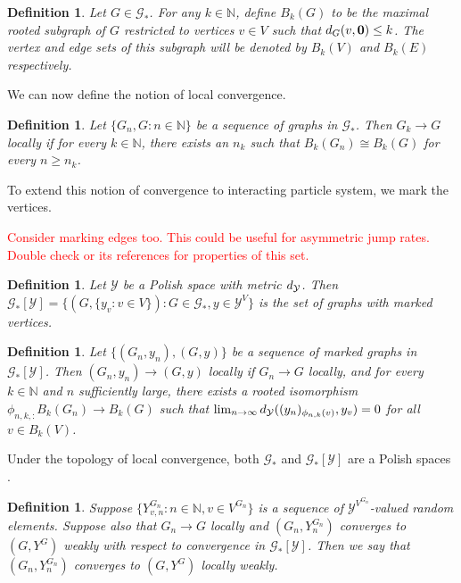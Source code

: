\documentclass[12pt]{article}
\newcommand{\skipLine}{\vspace{12pt}}
\newcommand{\mb}{\mathbb}
\newcommand{\mc}{\mathcal}
\newcommand{\ra}{\rightarrow}
\newcommand{\tr}{\textcolor{red}}
\renewcommand{\root}{\mathbf{0}}					%
\newcommand{\xg}{y}									%
\newcommand{\met}[2]{
\ifstrempty{#2}{
	d_{#1}}{
	d_{#1,#2}}}										%
\newcommand{\vind}[1]{_{#1}}						%
\newcommand{\gind}[1]{^{#1}}						%
\newcommand{\Gs}{\mc{G}_\ast}						%
\newcommand{\trnc}[1]{B_{#1}}						%
\newcommand{\spce}{\mc{Y}}							%
\renewcommand{\sp}[1]{[#1]}							%
\newcommand{\dit}[2]{_{#1,#2}}						%
\newcommand{\vindit}[2]{_{#1,#2}}					%
\newcommand{\Xg}{Y}									%
\renewcommand{\it}[1]{_{#1}}						%
\newtheorem{defn}[thms]{Definition}
\begin{document}
\begin{defn}
Let \(G \in \Gs\). For any \(k \in \mb{N}\), define \(\trnc{k}(G)\) to be the maximal rooted subgraph of \(G\) restricted to vertices \(v \in V\) such that \(\met{G}{}(v,\root) \leq k\). The vertex and edge sets of this subgraph will be denoted by \(\trnc{k}(V)\) and \(\trnc{k}(E)\) respectively.
\label{lwc::trnc}
\end{defn}

We can now define the notion of local convergence.

\begin{defn}
Let \(\{G\it{n},G:n\in\mb{N}\}\) be a sequence of graphs in \(\Gs\). Then \(G\it{k} \ra G\) locally if for every \(k \in \mb{N}\), there exists an \(n\it{k}\) such that \(\trnc{k}(G\it{n}) \cong \trnc{k}(G)\) for every \(n \geq n_k\).
\label{lwc::lc}
\end{defn}

To extend this notion of convergence to interacting particle system, we mark the vertices.

\skipLine

\tr{Consider marking edges too. This could be useful for asymmetric jump rates. Double check \cite{OliReiSto19} or its references for properties of this set.}

\begin{defn}
Let \(\spce\) be a Polish space with metric \(\met{\spce}{}\). Then \(\Gs\sp{\spce} = \{(G,\{\xg\vind{v}:v \in V\}): G \in \Gs, \xg\in \spce^V\}\) is the set of graphs with marked vertices.
\label{lwc::marked}
\end{defn}

\begin{defn}
Let \(\{(G\it{n},\xg\it{n}),(G,\xg)\}\) be a sequence of marked graphs in \(\Gs\sp{\spce}\). Then \((G\it{n},\xg\it{n}) \ra (G,\xg)\) locally if \(G\it{n} \ra G\) locally, and for every \(k \in \mb{N}\) and \(n\) sufficiently large, there exists a rooted isomorphism \(\phi\dit{n,k}:\trnc{k}(G\it{n}) \ra \trnc{k}(G)\) such that \(\lim_{n\ra\infty} \met{\spce}{}((\xg\it{n})\vind{\phi\dit{n}{k}(v)},\xg\vind{v}) = 0\) for all \(v \in \trnc{k}(V)\).
\label{lwc::mlc}
\end{defn}

Under the topology of local convergence, both \(\Gs\) and \(\Gs\sp{\spce}\) are a Polish spaces \cite[Lemmas A.2, A.3, and A.5]{LacRamWu19}.

\begin{defn}
Suppose \(\{\Xg\gind{G\it{n}}\vindit{v}{n}:n\in\mb{N},v \in V\gind{G\it{n}}\}\) is a sequence of \(\spce^{V\gind{G\it{n}}}\)-valued random elements. Suppose also that \(G\it{n} \ra G\) locally and \((G\it{n},\Xg\gind{G\it{n}}\it{n})\) converges to \((G,\Xg\gind{G})\) weakly with respect to convergence in \(\Gs\sp{\spce}\). Then we say that \((G\it{n},\Xg\gind{G\it{n}}\it{n})\) converges to \((G,\Xg\gind{G})\) locally weakly.
\label{lwc::lwc}
\end{defn}
\end{document}
